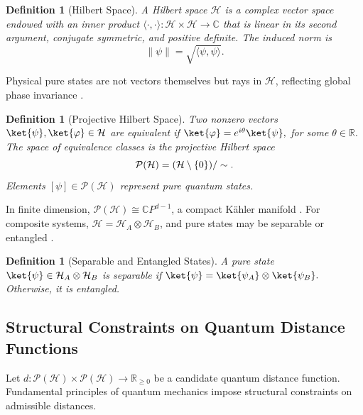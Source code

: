 \documentclass[aps,pra,reprint,nofootinbib,showpacs,superscriptaddress]{revtex4-1}
\newtheorem{definition}[theorem]{Definition}
\newcommand{\Proj}{\mathcal{P}}
\begin{document}
\begin{definition}[Hilbert Space]
A \emph{Hilbert space} $\mathcal{H}$ is a complex vector space endowed
with an inner product
$\langle \cdot,\cdot \rangle : \mathcal{H}\times\mathcal{H}\to\mathbb{C}$
that is linear in its second argument, conjugate symmetric,
and positive definite. The induced norm is
\[
\|\psi\| = \sqrt{\langle\psi,\psi\rangle}.
\]
\end{definition}

Physical pure states are not vectors themselves but rays in
$\mathcal{H}$, reflecting global phase invariance
\cite{vonNeumann1932,peres1997quantum}.

\begin{definition}[Projective Hilbert Space]
Two nonzero vectors $\ket{\psi},\ket{\varphi}\in\mathcal{H}$
are equivalent if
\(
\ket{\varphi}=e^{i\theta}\ket{\psi},\) for some \(\theta\in\mathbb{R}.\)
The space of equivalence classes is the
\emph{projective Hilbert space}
\begin{equation}\notag
\Proj(\mathcal{H})
=
(\mathcal{H}\setminus\{0\})/\sim .
\end{equation}
Elements $[\psi]\in\Proj(\mathcal{H})$ represent pure quantum states.
\end{definition}

In finite dimension,
$\Proj(\mathcal{H})\cong\mathbb{C}P^{d-1}$,
a compact Kähler manifold
\cite{bengtsson2017geometry}. For composite systems,
$\mathcal{H}=\mathcal{H}_A\otimes\mathcal{H}_B$,
and pure states may be separable or entangled
\cite{nielsen2010quantum}.

\begin{definition}[Separable and Entangled States]
A pure state $\ket{\psi}\in\mathcal{H}_A\otimes\mathcal{H}_B$
is \emph{separable} if
\(\ket{\psi}=\ket{\psi_A}\otimes\ket{\psi_B}.
\)
Otherwise, it is \emph{entangled}.
\end{definition}

\subsection{Structural Constraints on Quantum Distance Functions}

Let
\(
d:\Proj(\mathcal{H})\times\Proj(\mathcal{H})
\to\mathbb{R}_{\ge 0}
\)
be a candidate quantum distance function.
Fundamental principles of quantum mechanics impose structural
constraints on admissible distances.
\end{document}
